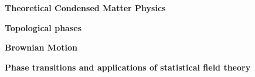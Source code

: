 

\begin{cventries}

  \cventry
    {} %
    {} %
    {} %
    {} %
    {
      \begin{cvitems} %
        \item {\textbf{Theoretical Condensed Matter Physics}}
        \item {\textbf{Topological phases}}
        \item {\textbf{Brownian Motion}}
        \item {\textbf{Phase transitions and applications of statistical field theory}}
      \end{cvitems}
    }

\end{cventries}
